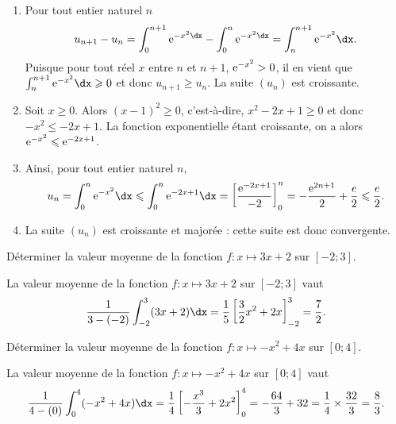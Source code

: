 \documentclass[11pt,fleqn, openany]{book} %
\begin{document}
\begin{solution}\hspace{0pt}
\begin{enumerate}
\item  Pour tout entier naturel \(n\)
\[ u_{n+1}-u_n = \displaystyle \int _{0}^{n+1}\e^{-x^2\dx}-\displaystyle \int _{0}^n\e^{-x^2\dx}=\displaystyle \int _{n}^{n+1}\e^{-x^2}\dx.\]
Puisque pour tout réel \(x\) entre \(n\) et \(n+1\), \(\mathrm{e}^{-x^2}>0\), il en vient que \(\int _{n}^{n+1}\e^{-x^2}\dx \geqslant 0\) et donc \(u_{n+1} \geqslant u_n\). La suite \((u_n)\) est croissante.
\item  Soit \(x\geqslant 0\). Alors \((x-1)^2\geqslant 0\), c'est-à-dire, \(x^2-2x+1 \geqslant 0\) et donc \(-x^2 \leqslant -2x+1\). La fonction exponentielle étant croissante, on a alors \(\mathrm{e}^{-x^2}\leqslant \mathrm{e}^{-2x+1}\).
\item  Ainsi, pour tout entier naturel \(n\),
\[u_n=\int _{0}^n\e^{-x^2}\dx \leqslant \int _{0}^n\e^{-2x+1}\dx = \left[\dfrac{\e^{-2x+1}}{-2}\right]_0^n=-\dfrac{\e^{2n+1}}{2}+\dfrac{e}{2}\leqslant \dfrac{e}{2}.\]

\item  La suite \((u_n)\) est croissante et majorée : cette suite est donc convergente.
\end{enumerate}\end{solution}



\begin{exercise}Déterminer la valeur moyenne de la fonction $f:x\mapsto 3x+2$ sur $[-2;3]$.\end{exercise}

\begin{solution}
La valeur moyenne de la fonction \(f:x\mapsto 3x+2\) sur \([-2;3]\) vaut
\[ \dfrac{1}{3-(-2)}\int_{-2}^3(3x+2)\dx = \dfrac{1}{5}\left[\dfrac{3}{2}x^2+2x\right]_{-2}^3=\dfrac{7}{2}.\]\end{solution}



\begin{exercise}Déterminer la valeur moyenne de la fonction $f:x\mapsto -x^2+4x$ sur $[0;4]$.\end{exercise}

\begin{solution}
La valeur moyenne de la fonction \(f:x\mapsto -x^2+4x\) sur \([0;4]\) vaut
\[ \dfrac{1}{4-(0)}\int_{0}^4(-x^2+4x)\dx = \dfrac{1}{4}\left[-\dfrac{x^3}{3}+2x^2\right]_{0}^4=-\dfrac{64}{3}+32 = \dfrac{1}{4}\times \dfrac{32}{3} = \dfrac{8}{3}.\]
\end{solution}
\end{document}
